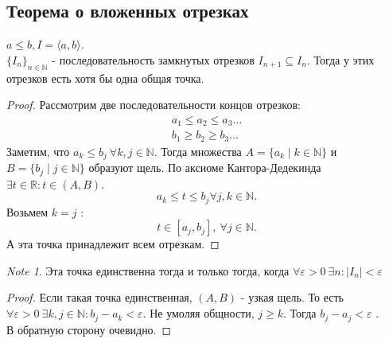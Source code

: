 \documentclass[11pt]{book}
\newcommand{\N}{\mathbb{N}}
\newcommand{\R}{\mathbb{R}}
\renewcommand{\le}{\leqslant}
\renewcommand{\ge}{\geqslant}
\theoremstyle{definition}
\theoremstyle{plain}
\theoremstyle{plain}
\theoremstyle{definition}
\theoremstyle{remark}
\newtheorem*{note}{Note}
\begin{document}
\subsection{Теорема о вложенных отрезках}\label{ques_10}
\begin{thm}\label{thm_nested_segment}
    $a \le b, I = \langle a, b \rangle$.\\
    $\{I_n\}_{n \in \N}$ - последовательность замкнутых отрезков $I_{n+1} \subseteq I_n$. Тогда у этих отрезков есть хотя бы одна общая точка.
\end{thm}
\begin{proof}
    Рассмотрим две последовательности концов отрезков:
     \[
	 \begin{array}{c}
         a_1 \le a_2 \le a_3 \ldots \\
	 b_1 \ge b_2 \ge b_3 \ldots 
     \end{array}
     \] 
     Заметим, что  $a_k \le b_j ~ \forall k, j \in \N$. Тогда множества $A = \{a_k \mid k \in \N\}$ и $B=\{b_j \mid j \in \N\}$ образуют щель. По аксиоме Кантора-Дедекинда $\exists t \in \R : t \in (A, B)$.
     \[
     a_k \le t \le b_j \forall j, k \in \N
     .\] 
     Возьмем $k = j$ :
     \[
	 t \in [a_j, b_j], ~ \forall j \in \N
     .\] 
     А эта точка принадлежит всем отрезкам.
\end{proof}
\begin{note}
    Эта точка единственна тогда и только тогда, когда $\forall \varepsilon > 0 ~\exists n : |I_n| < \varepsilon $
\end{note}
\begin{proof}
    Если такая точка единственная, $(A, B)$ - узкая щель. То есть $\forall \varepsilon >0 ~\exists k, j \in \N: b_j - a_k < \varepsilon $. Не умоляя общности, $j \ge k$. Тогда $b_j - a_j < \varepsilon $ . \\
    В обратную сторону очевидно. 
\end{proof}
\end{document}
